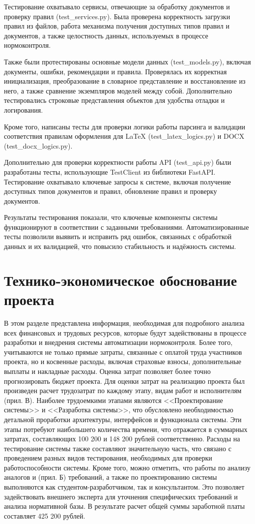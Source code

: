 \documentclass{report}
\begin{document}
Тестирование охватывало сервисы, отвечающие за обработку документов и проверку правил (test\_services.py). Была проверена корректность загрузки правил из файлов, работа механизма получения доступных типов правил и документов, а также целостность данных, используемых в процессе нормоконтроля.

Также были протестированы основные модели данных (test\_models.py), включая документы, ошибки, рекомендации и правила. Проверялась их корректная инициализация, преобразование в словарное представление и восстановление из него, а также сравнение экземпляров моделей между собой. Дополнительно тестировались строковые представления объектов для удобства отладки и логирования.

Кроме того, написаны тесты для проверки логики работы парсинга и валидации соответствия правилам оформления для LaTeX (test\_latex\_logics.py) и DOCX (test\_docx\_logics.py).

Дополнительно для проверки корректности работы API (test\_api.py) были разработаны тесты, использующие TestClient из библиотеки FastAPI. Тестирование охватывало ключевые запросы к системе, включая получение доступных типов документов и правил, обновление правил и проверку документов.

Результаты тестирования показали, что ключевые компоненты системы функционируют в соответствии с заданными требованиями. Автоматизированные тесты позволили выявить и исправить ряд ошибок, связанных с обработкой данных и их валидацией, что повысило стабильность и надёжность системы.

\section{Технико-экономическое обоснование проекта}

В этом разделе представлена информация, необходимая для подробного анализа всех финансовых и трудовых ресурсов, которые будут задействованы в процессе разработки и внедрения системы автоматизации нормоконтроля. Более того, учитываются не только прямые затраты, связанные с оплатой труда участников проекта, но и косвенные расходы, включая страховые взносы, дополнительные выплаты и накладные расходы. Оценка затрат позволяет более точно прогнозировать бюджет проекта.
Для оценки затрат на реализацию проекта был произведен расчет трудозатрат по каждому этапу, видам работ и исполнителям (прил. В). Наиболее трудоемкими этапами являются <<Проектирование системы>> и <<Разработка системы>>, что обусловлено необходимостью детальной проработки архитектуры, интерфейсов и функционала системы. Эти этапы потребуют наибольшего количества времени, что отражается в суммарных затратах, составляющих 100 200 и 148 200 рублей соответственно. 
Расходы на тестирование системы также составляют значительную часть, что связано с проведением разных видов тестирования, необходимых для проверки работоспособности системы. 
Кроме того, можно отметить, что работы по анализу аналогов и (прил. Б) требований, а также по проектированию системы выполняются как студентом-разработчиком, так и консультантом. Это позволяет задействовать внешнего эксперта для уточнения специфических требований и анализа нормативной базы.
В результате расчет общей суммы заработной платы составляет 425 200 рублей.
\end{document}
